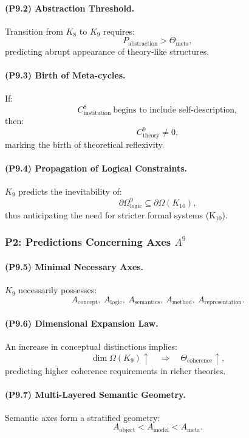 \paragraph{(P9.2) Abstraction Threshold.}
Transition from $K_8$ to $K_9$ requires:
\[
P_{\mathrm{abstraction}} > \Theta_{\mathrm{meta}},
\]
predicting abrupt appearance of theory-like structures.

\paragraph{(P9.3) Birth of Meta-cycles.}
If:
\[
C_{\mathrm{institution}}^{8} 
\ \text{begins to include self-description},
\]
then:
\[
C_{\mathrm{theory}}^9 \neq 0,
\]
marking the birth of theoretical reflexivity.

\paragraph{(P9.4) Propagation of Logical Constraints.}
$K_9$ predicts the inevitability of:
\[
\partial\Omega_{\mathrm{logic}}^{9}
\subseteq \partial\Omega(K_{10}),
\]
thus anticipating the need for stricter formal systems (K$_{10}$).

\subsubsection{P2: Predictions Concerning Axes \texorpdfstring{$A^9$}{A^9}}

\paragraph{(P9.5) Minimal Necessary Axes.}
$K_9$ necessarily possesses:
\[
A_{\mathrm{concept}},\ 
A_{\mathrm{logic}},\ 
A_{\mathrm{semantics}},\ 
A_{\mathrm{method}},\ 
A_{\mathrm{representation}}.
\]

\paragraph{(P9.6) Dimensional Expansion Law.}
An increase in conceptual distinctions implies:
\[
\dim \Omega(K_9) \uparrow 
\quad \Rightarrow \quad 
\Theta_{\mathrm{coherence}} \uparrow,
\]
predicting higher coherence requirements in richer theories.

\paragraph{(P9.7) Multi-Layered Semantic Geometry.}
Semantic axes form a stratified geometry:
\[
A_{\mathrm{object}} < A_{\mathrm{model}} < A_{\mathrm{meta}}.
\]


